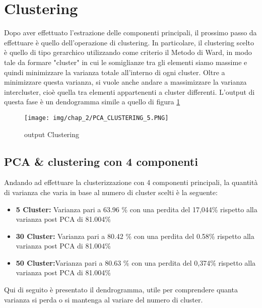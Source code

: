 \section{Clustering}
Dopo aver effettuato l'estrazione delle componenti principali, il prossimo passo da effettuare è quello dell'operazione di clustering. In particolare, il clustering scelto è quello di tipo gerarchico utilizzando come criterio il Metodo di Ward, in modo tale da formare "cluster" in cui le somiglianze tra gli elementi siamo massime e quindi minimizzare la varianza totale all'interno di ogni cluster.
Oltre a minimizzare questa varianza, si vuole anche andare a massimizzare la varianza intercluster, cioè quella tra elementi appartenenti a cluster differenti.
L'output di questa fase è un dendogramma simile a quello di figura \ref{fig:dendogramma}
\begin{figure}[H]
    \centering
    \texttt{[image: img/chap\_2/PCA\_CLUSTERING\_5.PNG]}
    \caption{output Clustering}
    \label{fig:dendogramma}
\end{figure}
\subsection{PCA \& clustering con 4 componenti}
Andando ad effettuare la clusterizzazione con 4 componenti principali, la quantità di varianza che varia in base al numero di cluster scelti è la seguente:
\begin{itemize}
  \item \textbf{5 Cluster:} Varianza pari a 63.96 \% con una perdita del 17,044\% rispetto alla varianza post PCA di 81.004\%
  \item \textbf{30 Cluster:} Varianza pari a 80.42 \% con una perdita del 0.58\% rispetto alla varianza post PCA di 81.004\%
  \item \textbf{50 Cluster:}Varianza pari a 80.63 \% con una perdita del 0,374\% rispetto alla varianza post PCA di 81.004\%
\end{itemize}
Qui di seguito è presentato il dendrogramma, utile per comprendere quanta varianza si perda o si mantenga al variare del numero di cluster.



